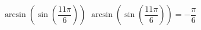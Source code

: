  {$\arcsin\left(\sin\left(\dfrac{11\pi}{6}\right) \right)$}
{ $\arcsin\left(\sin\left(\dfrac{11\pi}{6}\right) \right) = -\dfrac{\pi}{6}$}
